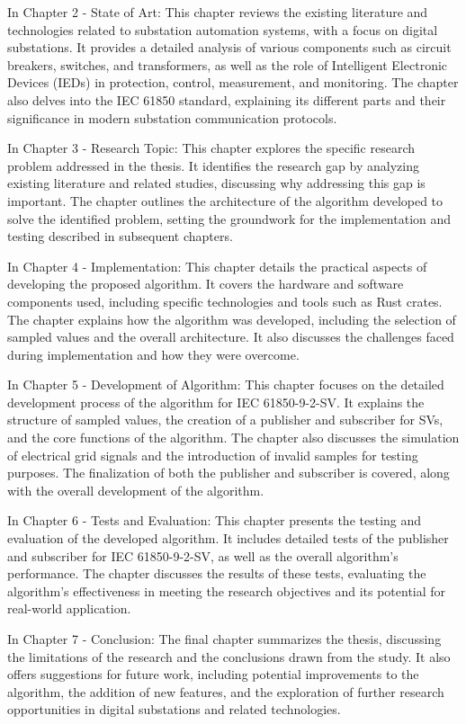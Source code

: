 In Chapter 2 - State of Art: This chapter reviews the existing literature and technologies related to substation automation systems, with a focus on digital substations. It provides a detailed analysis of various components such as circuit breakers, switches, and transformers, as well as the role of Intelligent Electronic Devices (IEDs) in protection, control, measurement, and monitoring. The chapter also delves into the IEC 61850 standard, explaining its different parts and their significance in modern substation communication protocols.

In Chapter 3 - Research Topic: This chapter explores the specific research problem addressed in the thesis. It identifies the research gap by analyzing existing literature and related studies, discussing why addressing this gap is important. The chapter outlines the architecture of the algorithm developed to solve the identified problem, setting the groundwork for the implementation and testing described in subsequent chapters.

In Chapter 4 - Implementation: This chapter details the practical aspects of developing the proposed algorithm. It covers the hardware and software components used, including specific technologies and tools such as Rust crates. The chapter explains how the algorithm was developed, including the selection of sampled values  and the overall architecture. It also discusses the challenges faced during implementation and how they were overcome.

In Chapter 5 - Development of Algorithm: This chapter focuses on the detailed development process of the algorithm for IEC 61850-9-2-SV. It explains the structure of sampled values, the creation of a publisher and subscriber for SVs, and the core functions of the algorithm. The chapter also discusses the simulation of electrical grid signals and the introduction of invalid samples for testing purposes. The finalization of both the publisher and subscriber is covered, along with the overall development of the algorithm.

In Chapter 6 - Tests and Evaluation: This chapter presents the testing and evaluation of the developed algorithm. It includes detailed tests of the publisher and subscriber for IEC 61850-9-2-SV, as well as the overall algorithm's performance. The chapter discusses the results of these tests, evaluating the algorithm's effectiveness in meeting the research objectives and its potential for real-world application.

In Chapter 7 - Conclusion: The final chapter summarizes the thesis, discussing the limitations of the research and the conclusions drawn from the study. It also offers suggestions for future work, including potential improvements to the algorithm, the addition of new features, and the exploration of further research opportunities in digital substations and related technologies.

